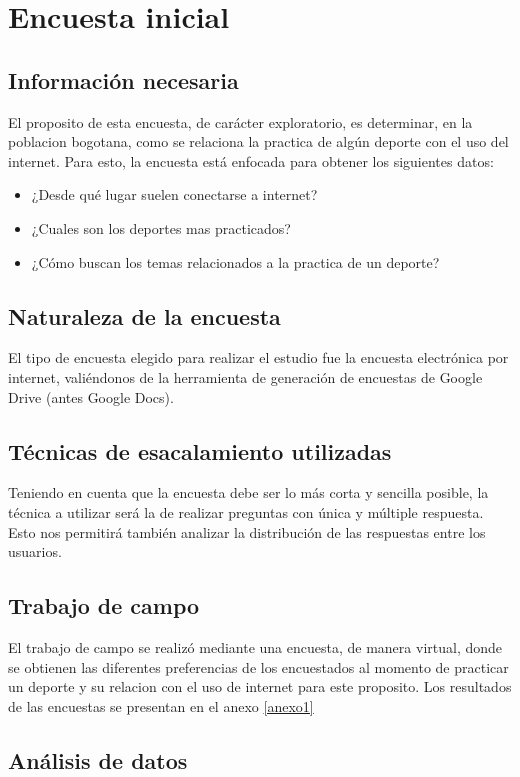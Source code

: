 \section{Encuesta inicial}

\subsection{Información necesaria}

El proposito de esta encuesta, de carácter exploratorio, es determinar, en la poblacion bogotana, como se relaciona la practica de algún deporte con el uso del internet.
Para esto, la encuesta está enfocada para obtener los siguientes datos:
\begin{itemize}
  \item ¿Desde qué lugar suelen conectarse a internet?
  \item ¿Cuales son los deportes mas practicados?
  \item ¿Cómo buscan los temas relacionados a la practica de un deporte?
\end{itemize}


\subsection{Naturaleza de la encuesta}

El tipo de encuesta elegido para realizar el estudio fue la encuesta electrónica por internet, valiéndonos de la herramienta de generación de encuestas de Google Drive (antes Google Docs).

\subsection{Técnicas de esacalamiento utilizadas}

Teniendo en cuenta que la encuesta debe ser lo más corta y sencilla posible, la técnica a utilizar será la de realizar preguntas con única y múltiple respuesta. Esto nos permitirá también analizar la distribución de las respuestas entre los usuarios.


\subsection{Trabajo de campo}

El trabajo de campo se realizó mediante una encuesta, de manera virtual, donde se obtienen las diferentes preferencias de los encuestados al momento de practicar un deporte y su relacion con el uso de internet para este proposito.
Los resultados de las encuestas se presentan en el anexo \ref{anexo1}

\subsection{Análisis de datos}
